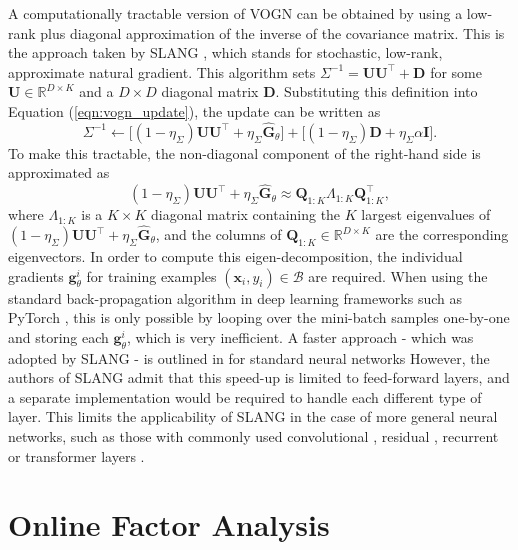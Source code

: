 \documentclass[msc,deptreport.inf]{infthesis} %
\newcommand{\matr}[1]{\mathbf{#1}}
\newcommand{\R}{\mathbb R}
\begin{document}
A computationally tractable version of VOGN can be obtained by using a low-rank plus diagonal approximation of the inverse of the covariance matrix. This is the approach taken by SLANG \cite{mishkin2018}, which stands for stochastic, low-rank, approximate natural gradient. This algorithm sets $\Sigma^{-1} = \matr{U} \matr{U}^\intercal + \matr{D}$ for some $\matr{U} \in \R^{D \times K}$ and a $D \times D$ diagonal matrix $\matr{D}$. Substituting this definition into Equation (\ref{eqn:vogn_update}), the update can be written as
\begin{equation}
	\Sigma^{-1} \leftarrow 
	\big[(1 - \eta_\Sigma) \matr{U} \matr{U}^\intercal + \eta_\Sigma \hat{\matr{G}}_\theta \big] 
	+ \big[(1 - \eta_\Sigma) \matr{D} + \eta_\Sigma \alpha \matr{I}\big].
\end{equation}
To make this tractable, the non-diagonal component of the right-hand side is approximated as
\begin{equation}
	(1 - \eta_\Sigma) \matr{U} \matr{U}^\intercal + \eta_\Sigma \hat{\matr{G}}_\theta 
	\approx \matr{Q}_{1:K} \Lambda_{1:K} \matr{Q}_{1:K}^\intercal,
\end{equation}
where $\Lambda_{1:K}$ is a $K \times K$ diagonal matrix containing the $K$ largest eigenvalues of $(1 - \eta_\Sigma) \matr{U} \matr{U}^\intercal + \eta_\Sigma \hat{\matr{G}}_\theta$, and the columns of $\matr{Q}_{1:K} \in \R^{D \times K}$ are the corresponding eigenvectors. In order to compute this eigen-decomposition, the individual gradients $\matr{g}_\theta^i$ for training examples  $(\matr{x}_i, y_i) \in \mathcal{B}$ are required. When using the standard back-propagation algorithm in deep learning frameworks such as PyTorch \cite{paszke2019}, this is only possible by looping over the mini-batch samples one-by-one and storing each $\matr{g}_\theta^i$, which is very inefficient. A faster approach - which was adopted by SLANG - is outlined in \cite{goodfellow2015} for standard neural networks However, the authors of SLANG admit that this speed-up is limited to feed-forward layers, and a separate implementation would be required to handle each different type of layer. This limits the applicability of SLANG in the case of more general neural networks, such as those with commonly used convolutional \cite{krizhevsky09}, residual \cite{he2015}, recurrent \cite{hochreiter1997} or transformer layers \cite{vaswani2017}.  


\chapter{Online Factor Analysis}\label{ch:online_fa}
\end{document}
